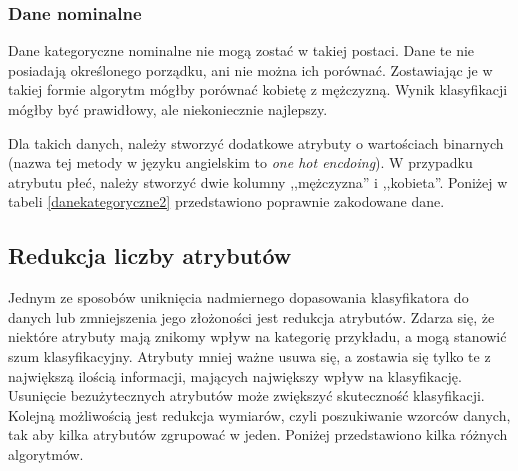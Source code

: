 \subsubsection{Dane nominalne}
Dane kategoryczne nominalne nie mogą zostać w takiej postaci. Dane te nie posiadają określonego porządku, ani nie można ich porównać. Zostawiając je w takiej formie algorytm mógłby porównać kobietę z mężczyzną. Wynik klasyfikacji mógłby być prawidłowy, ale niekoniecznie najlepszy. \par
Dla takich danych, należy stworzyć dodatkowe atrybuty o wartościach binarnych (nazwa tej metody w języku angielskim to \textit{one hot encdoing}). W przypadku atrybutu płeć, należy stworzyć dwie kolumny ,,mężczyzna'' i ,,kobieta''. Poniżej w tabeli \ref{danekategoryczne2} przedstawiono poprawnie zakodowane dane.
\begin{table}[H]
	\begin{center}
			\caption[Przykład danych z atrybutami kategorycznymi]{Przykład danych z atrybutami kategorycznymi danymi po odpowiednim kodowaniu.}
			\label{danekategoryczne2}
		\end{center}
	\end{table}
\subsection{Redukcja liczby atrybutów}
Jednym ze sposobów uniknięcia nadmiernego dopasowania klasyfikatora do danych lub zmniejszenia jego złożoności jest redukcja atrybutów. Zdarza się, że niektóre atrybuty mają znikomy wpływ na kategorię przykładu, a mogą stanowić szum klasyfikacyjny. Atrybuty mniej ważne usuwa się, a zostawia się tylko te z największą ilością informacji, mających największy wpływ na klasyfikację. Usunięcie bezużytecznych atrybutów może zwiększyć skuteczność klasyfikacji. Kolejną możliwością jest redukcja wymiarów, czyli poszukiwanie wzorców danych, tak aby kilka atrybutów zgrupować w jeden. Poniżej przedstawiono kilka różnych algorytmów.
